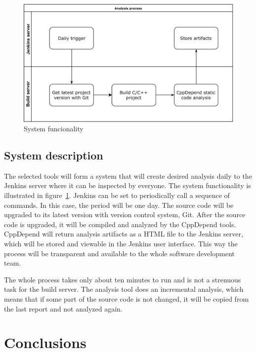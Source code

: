 \begin{figure}[t!]
\centering
\includegraphics[scale=0.06]{systemdesc.png}
\caption{System funcionality}
\label{fig:systemdesc}
\end{figure}

\section{System description}

The selected tools will form a system that will create desired analysis daily to the Jenkins server where it can be inspected by everyone. The system functionality is illustrated in figure~\ref{fig:systemdesc}. Jenkins can be set to periodically call a sequence of commands. In this case, the period will be one day. The source code will be upgraded to its latest version with version control system, Git. After the source code is upgraded, it will be compiled and analyzed by the CppDepend tools. CppDepend will return analysis artifacts as a HTML file to the Jenkins server, which will be stored and viewable in the Jenkins user interface.
This way the process will be transparent and available to the whole software development team.

The whole process takes only about ten minutes to run and is not a strenuous task for the build server. The analysis tool does an incremental analysis, which means that if some part of the source code is not changed, it will be copied from the last report and not analyzed again.





\chapter{Conclusions}

